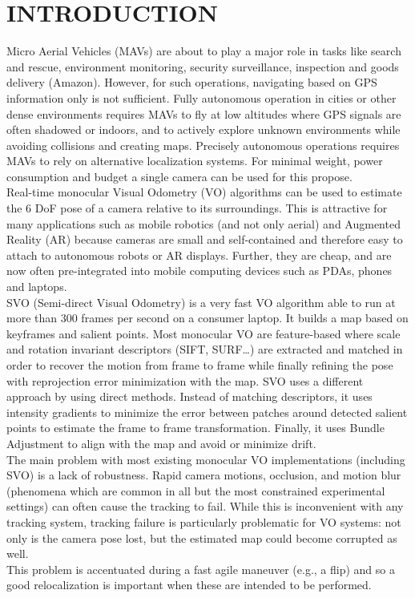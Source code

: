 

\section{INTRODUCTION}

Micro Aerial Vehicles (MAVs) are about to play a major role in tasks like search and rescue, environment monitoring, security surveillance, inspection and goods delivery (Amazon).  However, for such operations, navigating based on GPS information only is not sufficient. Fully autonomous operation in cities or other dense environments requires MAVs to fly at low altitudes where GPS signals are often shadowed or indoors, and to actively explore unknown environments while avoiding collisions and creating maps. Precisely autonomous operations requires MAVs to rely on alternative localization systems. For minimal weight, power consumption and budget a single camera can be used for this propose.\\

Real-time monocular Visual Odometry (VO) algorithms can be used to estimate the 6 DoF pose of a camera relative to its surroundings. This is attractive for many applications such as mobile robotics (and not only aerial) and Augmented Reality (AR) because cameras are small and self-contained and therefore easy to attach to autonomous robots or AR displays. Further, they are cheap, and are now often pre-integrated into mobile computing devices such as PDAs, phones and laptops.\\

SVO (Semi-direct Visual Odometry) \cite{Forster2014} is a very fast VO algorithm able to run at more than 300 frames per second on a consumer laptop. It builds a map based on keyframes and salient points. Most monocular VO are feature-based where scale and rotation invariant descriptors (SIFT, SURF\ldots) are extracted and matched in order to recover the motion from frame to frame while finally refining the pose with reprojection error minimization with the map. SVO uses a different approach by using direct methods. Instead of matching descriptors, it uses intensity gradients to minimize the error between patches around detected salient points to estimate the frame to frame transformation. Finally, it uses Bundle Adjustment to align with the map and avoid or minimize drift.\\

The main problem with most existing monocular VO implementations (including SVO) is a lack of robustness. Rapid camera motions, occlusion, and motion blur (phenomena which are common in all but the most constrained experimental settings) can often cause the tracking to fail. While this is inconvenient with any tracking system, tracking failure is particularly problematic for VO systems: not only is the camera pose lost, but the estimated map could become corrupted as well. \\

This problem is accentuated during a fast  agile maneuver (e.g., a flip) and so a good relocalization is important when these are intended to be performed. \\
